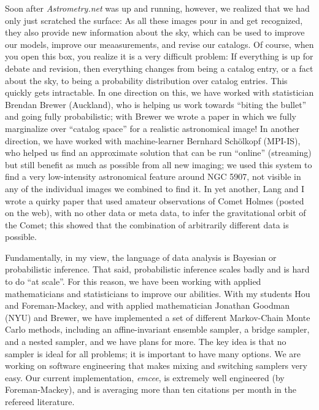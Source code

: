 \documentclass[11pt, letterpaper]{article}
\begin{document}
Soon after \textsl{Astrometry.net} was up and running, however,
  we realized that we had only just scratched the surface:
As all these images pour in and get recognized, they also provide new information about the sky,
  which can be used to improve our models, improve our meaasurements, and revise our catalogs.
Of course, when you open this box, you realize it is a very difficult problem:
  If everything is up for debate and revision, then everything changes from being a catalog entry,
  or a fact about the sky, to being a probability distribution over catalog entries.
This quickly gets intractable.
In one direction on this, we have worked with statistician Brendan Brewer (Auckland),
  who is helping us work towards ``biting the bullet'' and going fully probabilistic;
  with Brewer we wrote a paper in which we fully marginalize over ``catalog space'' for a realistic astronomical image!
In another direction, we have worked with machine-learner Bernhard Sch\"olkopf (MPI-IS),
  who helped us find an approximate solution that can be run ``online'' (streaming) but still benefit
  as much as possible from all new imaging;
  we used this system to find a very low-intensity astronomical feature around NGC 5907,
  not visible in any of the individual images we combined to find it.
In yet another, Lang and I wrote a quirky paper that used amateur observations of Comet Holmes (posted on the web),
  with no other data or meta data,
  to infer the gravitational orbit of the Comet;
  this showed that the combination of arbitrarily different data is possible.

Fundamentally, in my view, the language of data analysis is Bayesian or probabilistic inference.
That said, probabilistic inference scales badly and is hard to do ``at scale''.
For this reason, we have been working with applied mathematicians and statisticians to improve our abilities.
With my students Hou and Foreman-Mackey, and with applied mathematician Jonathan Goodman (NYU) and Brewer,
  we have implemented a set of different Markov-Chain Monte Carlo methods,
  including an affine-invariant ensemble sampler, a bridge sampler, and a nested sampler,
  and we have plans for more.
The key idea is that no sampler is ideal for all problems; it is important to have many options.
We are working on software engineering that makes mixing and switching samplers very easy.
Our current implementation, \textsl{emcee}, is extremely well engineered (by Foreman-Mackey),
  and is averaging more than ten citations per month in the refereed literature.
\end{document}
